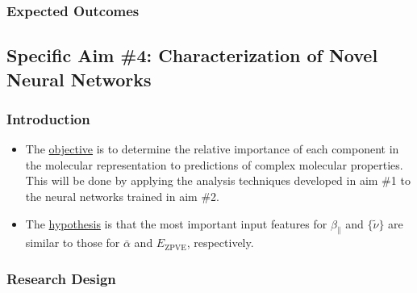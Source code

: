 \documentclass[12pt]{article}
\begin{document}
\subsubsection{Expected Outcomes}
\label{sec:orgf801342}

\subsection{Specific Aim \#4: Characterization of Novel Neural Networks}
\label{sec:org88a83d9}

\subsubsection{Introduction}
\label{sec:org3ff9d04}

\begin{itemize}
\item The \uline{objective} is to determine the relative importance of each component in the molecular representation to predictions of complex molecular properties. This will be done by applying the analysis techniques developed in aim \#1 to the neural networks trained in aim \#2.

\item The \uline{hypothesis} is that the most important input features for \(\beta_{\parallel}\) and \(\{\tilde{\nu}\}\) are similar to those for \(\bar{\alpha}\) and \(E_{\text{ZPVE}}\), respectively.
\end{itemize}

\subsubsection{Research Design}
\label{sec:orgb03c040}
\end{document}
